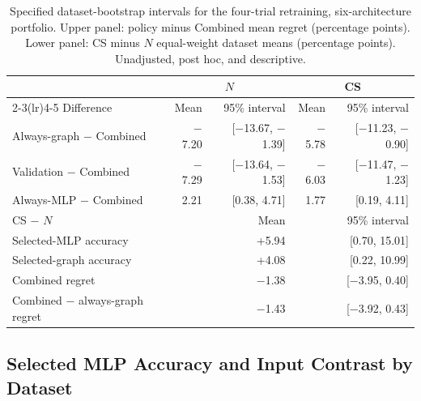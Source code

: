 \begin{table}[ht]
\centering
\caption{Specified dataset-bootstrap intervals for the four-trial retraining, six-architecture portfolio. Upper panel: policy minus Combined mean regret (percentage points). Lower panel: CS minus $N$ equal-weight dataset means (percentage points). Unadjusted, post hoc, and descriptive.}
\label{tab:mlp_budget_intervals}
\small
\begin{tabular}{@{}lrrrr@{}}
\toprule
 & \multicolumn{2}{c}{$N$} & \multicolumn{2}{c}{CS} \\
\cmidrule(lr){2-3}\cmidrule(lr){4-5}
Difference & Mean & 95\% interval & Mean & 95\% interval \\
\midrule
Always-graph $-$ Combined & $-$7.20 & [$-$13.67, $-$1.39] & $-$5.78 & [$-$11.23, $-$0.90] \\
Validation $-$ Combined & $-$7.29 & [$-$13.64, $-$1.53] & $-$6.03 & [$-$11.47, $-$1.23] \\
Always-MLP $-$ Combined & 2.21 & [0.38, 4.71] & 1.77 & [0.19, 4.11] \\
\midrule
CS $-$ $N$ & \multicolumn{2}{r}{Mean} & \multicolumn{2}{r}{95\% interval} \\
\midrule
Selected-MLP accuracy & \multicolumn{2}{r}{+5.94} & \multicolumn{2}{r}{[0.70, 15.01]} \\
Selected-graph accuracy & \multicolumn{2}{r}{+4.08} & \multicolumn{2}{r}{[0.22, 10.99]} \\
Combined regret & \multicolumn{2}{r}{$-$1.38} & \multicolumn{2}{r}{[$-$3.95, 0.40]} \\
Combined $-$ always-graph regret & \multicolumn{2}{r}{$-$1.43} & \multicolumn{2}{r}{[$-$3.92, 0.43]} \\
\bottomrule
\end{tabular}
\end{table}

\subsection{Selected MLP Accuracy and Input Contrast by Dataset}

